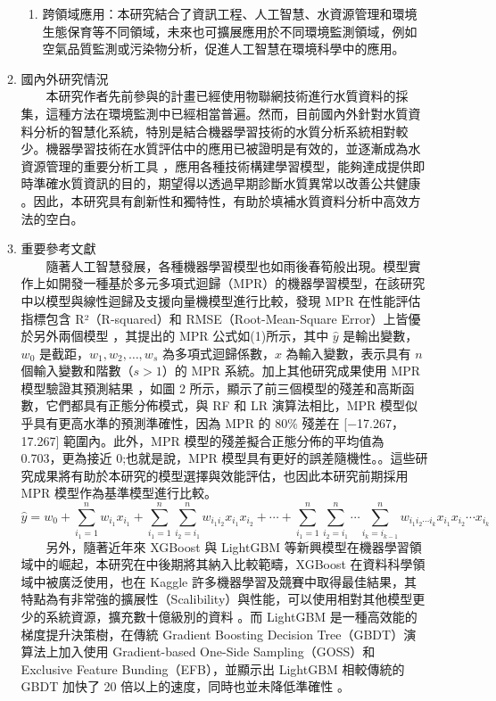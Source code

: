 \documentclass[12pt,a4paper]{article}
\begin{document}
\begin{enumerate}
\begin{enumerate}[label=\arabic*.]
\begin{enumerate}[label=1-5-\arabic*.]
        \item 跨領域應用：本研究結合了資訊工程、人工智慧、水資源管理和環境生態保育等不同領域，未來也可擴展應用於不同環境監測領域，例如空氣品質監測或污染物分析，促進人工智慧在環境科學中的應用。
    \end{enumerate}
\item 國內外研究情況\\
　　本研究作者先前參與的計畫已經使用物聯網技術進行水質資料的採集，這種方法在環境監測中已經相當普遍。然而，目前國內外針對水質資料分析的智慧化系統，特別是結合機器學習技術的水質分析系統相對較少。機器學習技術在水質評估中的應用已被證明是有效的，並逐漸成為水資源管理的重要分析工具 \cite{ref4}，應用各種技術構建學習模型，能夠達成提供即時準確水質資訊的目的，期望得以透過早期診斷水質異常以改善公共健康 \cite{ref5}。因此，本研究具有創新性和獨特性，有助於填補水質資料分析中高效方法的空白。
\item 重要參考文獻\\
　　隨著人工智慧發展，各種機器學習模型也如雨後春筍般出現。模型實作上如開發一種基於多元多項式迴歸（MPR）的機器學習模型，在該研究中以模型與線性迴歸及支援向量機模型進行比較，發現 MPR 在性能評估指標包含 R²（R-squared）和 RMSE（Root-Mean-Square Error）上皆優於另外兩個模型 \cite{ref6}，其提出的 MPR 公式如(1)所示，其中 $\hat{y}$ 是輸出變數，$w_0$ 是截距，$w_1, w_2, \ldots, w_s$ 為多項式迴歸係數，$x$ 為輸入變數，表示具有 $n$ 個輸入變數和階數（$s > 1$）的 MPR 系統。加上其他研究成果使用 MPR 模型驗證其預測結果 \cite{ref7}，如圖 2 所示，顯示了前三個模型的殘差和高斯函數，它們都具有正態分佈模式，與 RF 和 LR 演算法相比，MPR 模型似乎具有更高水準的預測準確性，因為 MPR 的 80\% 殘差在 [−17.267， 17.267] 範圍內。此外，MPR 模型的殘差擬合正態分佈的平均值為 0.703，更為接近 0;也就是說，MPR 模型具有更好的誤差隨機性。\cite{ref8}。這些研究成果將有助於本研究的模型選擇與效能評估，也因此本研究前期採用 MPR 模型作為基準模型進行比較。\\
    \begin{equation}
        \hat{y} = w_0 + \sum_{i_1=1}^{n} w_{i_1} x_{i_1} + \sum_{i_1=1}^{n} \sum_{i_2=i_1}^{n} w_{i_1 i_2} x_{i_1} x_{i_2} + \cdots + \sum_{i_1=1}^{n} \sum_{i_2=i_1}^{n} \cdots \sum_{i_k=i_{k-1}}^{n} w_{i_1 i_2 \cdots i_k} x_{i_1} x_{i_2} \cdots x_{i_k}
    \end{equation}
　　另外，隨著近年來 XGBoost 與 LightGBM 等新興模型在機器學習領域中的崛起，本研究在中後期將其納入比較範疇，XGBoost 在資料科學領域中被廣泛使用，也在 Kaggle 許多機器學習及競賽中取得最佳結果，其特點為有非常強的擴展性（Scalibility）與性能，可以使用相對其他模型更少的系統資源，擴充數十億級別的資料 \cite{ref9}。而 LightGBM 是一種高效能的梯度提升決策樹，在傳統 Gradient Boosting Decision Tree（GBDT）演算法上加入使用 Gradient-based One-Side Sampling（GOSS）和 Exclusive Feature Bunding（EFB），並顯示出 LightGBM 相較傳統的 GBDT 加快了 20 倍以上的速度，同時也並未降低準確性 \cite{ref10}。\\

\end{enumerate}
\end{enumerate}
\end{document}
